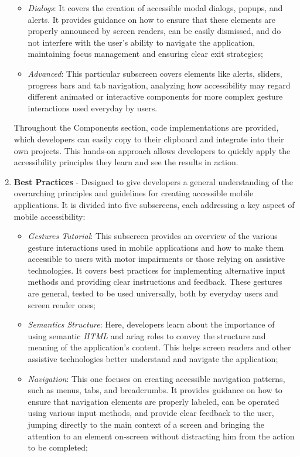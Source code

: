 \begin{enumerate}
\begin{itemize}
        \item \textit{Dialogs}: It covers the creation of accessible modal dialogs, popups, and alerts. It provides guidance on how to ensure that these elements are properly announced by screen readers, can be easily dismissed, and do not interfere with the user's ability to navigate the application, maintaining focus management and ensuring clear exit strategies;

       \item \textit{Advanced}: This particular subscreen covers elements like alerts, sliders, progress bars and tab navigation, analyzing how accessibility may regard different animated or interactive components for more complex gesture interactions used everyday by users.
    \end{itemize}

Throughout the Components section, code implementations are provided, which developers can easily copy to their clipboard and integrate into their own projects. This hands-on approach allows developers to quickly apply the accessibility principles they learn and see the results in action.

\item \textbf{Best Practices} - Designed to give developers a general understanding of the overarching principles and guidelines for creating accessible mobile applications. It is divided into five subscreens, each addressing a key aspect of mobile accessibility:

    \begin{itemize}
        \item \textit{Gestures Tutorial}: This subscreen provides an overview of the various gesture interactions used in mobile applications and how to make them accessible to users with motor impairments or those relying on assistive technologies. It covers best practices for implementing alternative input methods and providing clear instructions and feedback. These gestures are general, tested to be used universally, both by everyday users and screen reader ones;

        \item \textit{Semantics Structure}: Here, developers learn about the importance of using semantic \textit{HTML} and \gls{ariag} roles to convey the structure and meaning of the application's content. This helps screen readers and other assistive technologies better understand and navigate the application;

        \item \textit{Navigation}: This one focuses on creating accessible navigation patterns, such as menus, tabs, and breadcrumbs. It provides guidance on how to ensure that navigation elements are properly labeled, can be operated using various input methods, and provide clear feedback to the user, jumping directly to the main context of a screen and bringing the attention to an element on-screen without distracting him from the action to be completed;


\end{itemize}
\end{enumerate}
